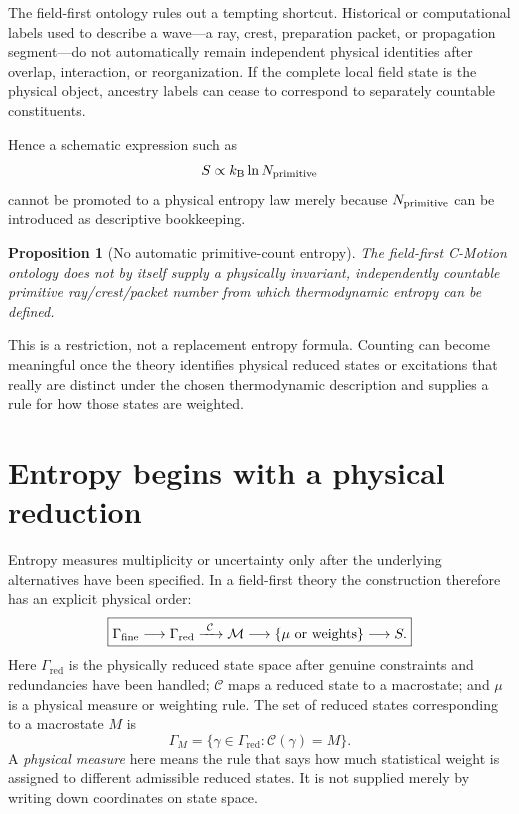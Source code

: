 \documentclass[11pt]{article}
\newtheorem{proposition}[theorem]{Proposition}
\theoremstyle{definition}
\newcommand{\cmotion}{\mbox{C-Motion}}
\newcommand{\kb}{k_{\mathrm B}}
\newcommand{\GammaFine}{\Gamma_{\mathrm{fine}}}
\newcommand{\GammaRed}{\Gamma_{\mathrm{red}}}
\begin{document}
The field-first ontology rules out a tempting shortcut.  Historical or computational
labels used to describe a wave---a ray, crest, preparation packet, or propagation
segment---do not automatically remain independent physical identities after overlap,
interaction, or reorganization.  If the complete local field state is the physical
object, ancestry labels can cease to correspond to separately countable constituents.

Hence a schematic expression such as
\begin{equation}
  S\propto \kb\ln N_{\rm primitive}
  \label{eq:primitive-count-rejected}
\end{equation}
cannot be promoted to a physical entropy law merely because $N_{\rm primitive}$ can be
introduced as descriptive bookkeeping.

\begin{proposition}[No automatic primitive-count entropy]
\label{prop:no-count-entropy}
The field-first \cmotion{} ontology does not by itself supply a physically invariant,
independently countable primitive ray/crest/packet number from which thermodynamic
entropy can be defined.
\end{proposition}

This is a restriction, not a replacement entropy formula.  Counting can become
meaningful once the theory identifies physical reduced states or excitations that really
are distinct under the chosen thermodynamic description and supplies a rule for how
those states are weighted.

\section{Entropy begins with a physical reduction}
\label{sec:entropy-gate}
Entropy measures multiplicity or uncertainty only after the underlying alternatives have
been specified.  In a field-first theory the construction therefore has an explicit
physical order:
\begin{equation}
  \boxed{
  \GammaFine
  \longrightarrow
  \GammaRed
  \xrightarrow{\ \mathcal C\ }
  \mathcal M
  \longrightarrow
  \{\mu\ \hbox{or weights}\}
  \longrightarrow
  S.}
  \label{eq:entropy-pipeline}
\end{equation}
Here $\GammaRed$ is the physically reduced state space after genuine constraints and
redundancies have been handled; $\mathcal C$ maps a reduced state to a macrostate; and
$\mu$ is a physical measure or weighting rule.  The set of reduced states corresponding
to a macrostate $M$ is
\begin{equation}
  \Gamma_M=\{\gamma\in\GammaRed:\mathcal C(\gamma)=M\}.
  \label{eq:macroregion}
\end{equation}
A \emph{physical measure} here means the rule that says how much statistical weight is
assigned to different admissible reduced states.  It is not supplied merely by writing
down coordinates on state space.
\end{document}
